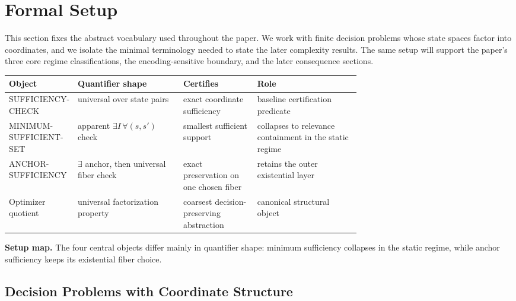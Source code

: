 \section{Formal Setup}\label{sec:formal-setup}

This section fixes the abstract vocabulary used throughout the paper. We work with finite decision problems whose state spaces factor into coordinates, and we isolate the minimal terminology needed to state the later complexity results. The same setup will support the paper's three core regime classifications, the encoding-sensitive boundary, and the later consequence sections.

\begingroup
\centering
\small
\setlength{\tabcolsep}{4pt}
\renewcommand{\arraystretch}{1.12}
\renewcommand{\tabularxcolumn}[1]{m{#1}}
\begin{tabularx}{\linewidth}{@{}>{\RaggedRight\arraybackslash}m{0.18\linewidth}>{\RaggedRight\arraybackslash}m{0.30\linewidth}>{\RaggedRight\arraybackslash}m{0.21\linewidth}>{\RaggedRight\arraybackslash}X@{}}
\toprule
\textbf{Object} & \textbf{Quantifier shape} & \textbf{Certifies} & \textbf{Role} \\
\midrule
SUFFICIENCY-CHECK & universal over state pairs & exact coordinate sufficiency & baseline certification predicate \\
\midrule
MINIMUM-SUFFICIENT-SET & \parbox[c]{0.20\linewidth}{apparent $\exists I\,\forall (s,s')$ check} & smallest sufficient support & collapses to relevance containment in the static regime \\
\midrule
ANCHOR-SUFFICIENCY & $\exists$ anchor, then universal fiber check & exact preservation on one chosen fiber & retains the outer existential layer \\
\midrule
Optimizer quotient & universal factorization property & coarsest decision-preserving abstraction & canonical structural object \\
\bottomrule
\end{tabularx}
\par\smallskip
\textbf{Setup map.} The four central objects differ mainly in quantifier shape: minimum sufficiency collapses in the static regime, while anchor sufficiency keeps its existential fiber choice.
\endgroup

\subsection{Decision Problems with Coordinate Structure}

